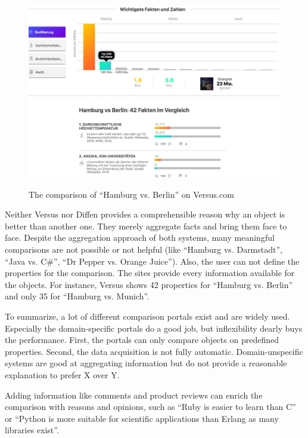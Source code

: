 \begin{figure}[h]
	\includegraphics[width=1\textwidth]{images/ds-sys/versus}
	\label{img:versus}
	\caption{The comparison of \enquote{Hamburg vs. Berlin} on Versus.com}
\end{figure}

Neither Versus nor Diffen provides a comprehensible reason why an object is better than another one. They merely aggregate facts and bring them face to face. Despite the aggregation approach of both systems, many meaningful comparisons are not possible or not helpful (like \enquote{Hamburg vs. Darmstadt}, \enquote{Java vs. C\#}, \enquote{Dr Pepper vs. Orange Juice}).
Also, the user can not define the properties for the comparison. The sites provide every information available for the objects. For instance, Versus shows 42 properties for \enquote{Hamburg vs. Berlin} and only 35 for \enquote{Hamburg vs. Munich}.
\newline

To summarize, a lot of different comparison portals exist and are widely used. Especially the domain-specific portals do a good job, but inflexibility dearly buys the performance. First, the portals can only compare objects on predefined properties. Second, the data acquisition is not fully automatic. Domain-unspecific systems are good at aggregating information but do not provide a reasonable explanation to prefer X over Y.

Adding information like comments and product reviews can enrich the comparison with reasons and opinions, such as \enquote{Ruby is easier to learn than C} or \enquote{Python is more suitable for scientific applications than Erlang as many libraries exist}.


